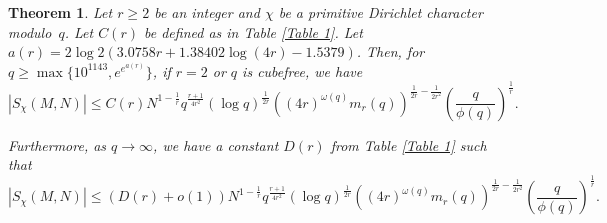 \documentclass[10pt,a4paper]{amsart}
\newtheorem{theorem}{Theorem}
\begin{document}
\begin{theorem}\label{main thm 1}
Let $r\ge 2$ be an integer and $\chi$ be a primitive Dirichlet character modulo~$q$. Let $C(r)$ be defined as in Table \ref{Table 1}. Let $a(r) = 2\log{2}\left(3.0758r+1.38402\log(4r)-1.5379\right)$. Then, for $q \ge \max\{10^{1143},e^{e^{a(r)}}\}$, if $r=2$ or $q$ is cubefree, we have
    $$|S_{\chi}(M,N)| \le C(r)N^{1-\frac{1}{r}} q^{\frac{r+1}{4r^2}}(\log{q})^{\frac{1}{2r}}\left((4r)^{\omega(q)}m_r(q)\right)^{\frac{1}{2r}-\frac{1}{2r^2}}\left(\frac{q}{\phi(q)}\right)^{\frac{1}{r}}.$$

    Furthermore, as $q\rightarrow\infty$, we have a constant $D(r)$ from Table \ref{Table 1} such that
    $$|S_{\chi}(M,N)| \le (D(r)+o(1))N^{1-\frac{1}{r}} q^{\frac{r+1}{4r^2}}(\log{q})^{\frac{1}{2r}}\left((4r)^{\omega(q)}m_r(q)\right)^{\frac{1}{2r}-\frac{1}{2r^2}}\left(\frac{q}{\phi(q)}\right)^{\frac{1}{r}}.$$
\end{theorem}
\end{document}
